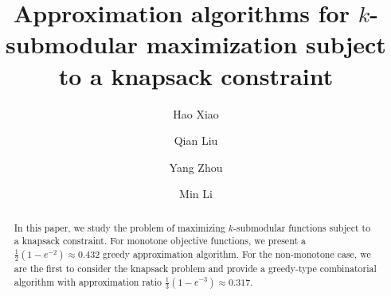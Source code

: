 \documentclass[preprint,12pt]{elsarticle}
\begin{document}
\begin{frontmatter}



\title{Approximation algorithms for $k$-submodular maximization subject to a knapsack constraint}

\author[1]{Hao Xiao}
\author[1]{Qian Liu}
\author[1]{Yang Zhou}
\author[1]{Min Li}




\address[1]{School of Mathematics and Statistics, Shandong Normal University, P.R. China.}


\begin{abstract}
In this paper, we study the problem of maximizing $k$-submodular functions subject to a knapsack constraint.
For monotone objective functions, we present a $\frac{1}{2}(1-e^{-2}) \approx 0.432$ greedy approximation algorithm.
For the non-monotone case, we are the first to consider the knapsack problem and provide a greedy-type combinatorial algorithm with approximation ratio $\frac{1}{3}(1-e^{-3}) \approx 0.317$.
\end{abstract}






\end{frontmatter}
\end{document}
